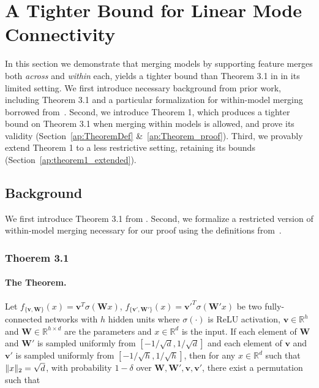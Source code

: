 \newcommand{\vv}{{\mathbf{v}}}
\newcommand{\vvP}{{\mathbf{v'}}}
\newcommand{\vvPP}{{\mathbf{v''}}}
\newcommand{\vW}{{\mathbf{W}}}
\newcommand{\vWP}{{\mathbf{W'}}}
\newcommand{\vWPP}{{\mathbf{W''}}}
\newcommand{\thetar}{\bm{\theta}_r}
\newcommand{\thetah}{\bm{\theta}_h}
\newcommand{\vvR}{{H_{m\rightarrow r}^v(\mathbf{v})}}
\DeclarePairedDelimiter{\norm}{\lVert}{\rVert} %

\section{A Tighter Bound for Linear Mode Connectivity}\label{ap:Theorem}
In this section we demonstrate that merging models by supporting feature merges both \textit{across} and \textit{within} each, yields a tighter bound than Theorem 3.1 in \citep{entezari2021role} in its limited setting.
We first introduce necessary background from prior work, including Theorem 3.1 and a particular formalization for within-model merging borrowed from~\citep{simsek2021geometry}.
Second, we introduce Theorem 1, which produces a tighter bound on Theorem 3.1 when merging within models is allowed, and prove its validity (Section~\ref{ap:TheoremDef} \&~\ref{ap:Theorem_proof}). 
Third, we provably extend Theorem 1 to a less restrictive setting, retaining its bounds (Section~\ref{ap:theorem1_extended}).

\subsection{Background}\label{ap:Theorem_background}
We first introduce Theorem 3.1 from \citep{entezari2021role}. Second, we formalize a restricted version of within-model merging necessary for our proof using the definitions from~\cite{simsek2021geometry}. 

\subsubsection{Thoerem 3.1}\label{ap:theorem3.1}
\paragraph{The Theorem. } Let $f_{\{\vv,\vW\}}(x)=\vv^T\sigma(\vW x)$, $f_{\{\vvP,\vWP\}}(x)=\vv'^T\sigma(\vW' x)$ be two fully-connected networks with $h$ hidden units where $\sigma(\cdot)$ is ReLU activation, $\vv\in\mathbb{R}^h$ and $\vW\in\mathbb{R}^{h\times d}$ are the parameters and $x\in\mathbb{R}^d$ is the input. If each element of $\vW$ and $\vWP$ is sampled uniformly from $[-1/\sqrt{d},1/\sqrt{d}]$ and each element of $\vv$ and $\vvP$ is sampled uniformly from $[-1/\sqrt{h},1/\sqrt{h}]$, then for any $x\in\mathbb{R}^d$ such that $\norm{x}_2=\sqrt{d}$, with probability $1-\delta$ over $\vW,\vWP, \vv, \vvP$, there exist a permutation such that

